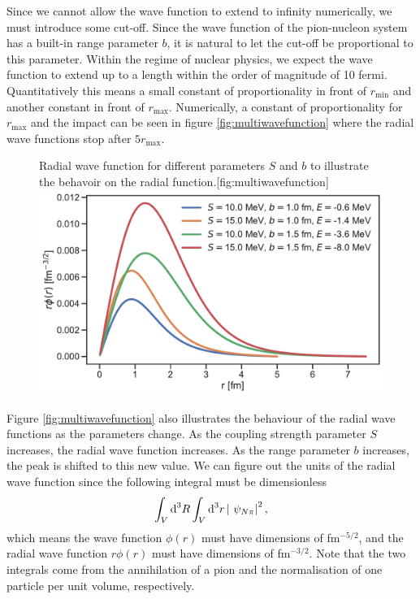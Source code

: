 Since we cannot allow the wave function to extend to infinity numerically, we must introduce some cut-off. Since the wave function of the pion-nucleon system has a built-in range parameter $b$, it is natural to let the cut-off be proportional to this parameter.
Within the regime of nuclear physics, we expect the wave function to extend up to a length within the order of magnitude of 10 fermi. Quantitatively this means a small constant of proportionality in front of $r_\text{min}$ and another constant in front of $r_{\text{max}}$. Numerically, a constant of proportionality for $r_{\text{max}}$ and the impact can be seen in figure \ref{fig:multiwavefunction} where the radial wave functions stop after $5r_\text{max}$.
\begin{figure}[H]
	\begin{sidecaption}{Radial wave function for different parameters $S$ and $b$ to illustrate the behavoir on the radial function.}[fig:multiwavefunction]
		\includegraphics[width=\linewidth]{Figures/multiwavefunction.pdf}
	\end{sidecaption}
\end{figure} 
Figure \ref{fig:multiwavefunction} also illustrates the behaviour of the radial wave functions as the parameters change. As the coupling strength parameter $S$ increases, the radial wave function increases. As the range parameter $b$ increases, the peak is shifted to this new value. We can figure out the units of the radial wave function since the following integral must be dimensionless 
\begin{equation} \label{volint}
	\int_V \text{d}^3R \int_V \text{d}^3r \, \abs{ \psi_{N\pi}}^2,
\end{equation}
which means the wave function $\phi(r)$ must have dimensions of fm$^{-5/2}$, and the radial wave function $r\phi(r)$ must have dimensions of fm$^{-3/2}$. Note that the two integrals come from the annihilation of a pion and the normalisation of one particle per unit volume, respectively.

